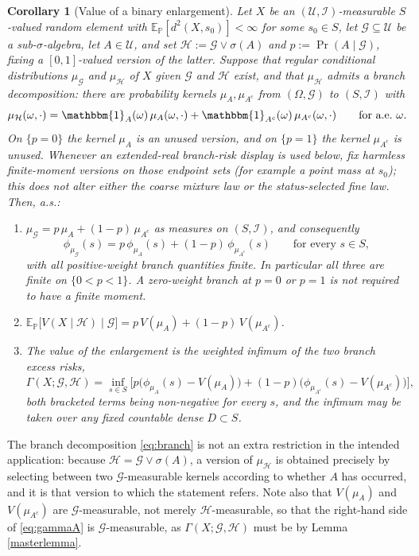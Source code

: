 \documentclass{article}
\newcommand{\E}{\mathbb{E}_{\mathbb{P}}}
\newcommand{\G}{\mathcal{G}}
\newcommand{\I}{\mathcal{I}}
\newcommand{\U}{\mathcal{U}}
\newcommand{\1}{\mathbbm{1}}
\newtheorem{cor}{Corollary}
\begin{document}
\begin{cor}[Value of a binary enlargement]
\label{oraclegap}
Let $X$ be an $(\U,\I)$-measurable $S$-valued random element with
$\E[d^2(X,s_0)]<\infty$ for some $s_0\in S$, let $\G\subseteq\U$ be a
sub-$\sigma$-algebra, let $A\in\U$, and set $\mathcal{H}:=\G\vee\sigma(A)$ and
$p:=\Pr(A\mid\G)$, fixing a $[0,1]$-valued version of the latter. Suppose that
regular conditional distributions $\mu_\G$ and $\mu_\mathcal{H}$ of $X$ given
$\G$ and $\mathcal{H}$ exist, and that $\mu_\mathcal{H}$ admits a branch
decomposition: there are probability kernels $\mu_A,\mu_{A^c}$ from
$(\Omega,\G)$ to $(S,\I)$ with
\begin{equation}\label{eq:branch}
\mu_\mathcal{H}(\omega,\cdot)=\1_A(\omega)\,\mu_A(\omega,\cdot)
+\1_{A^c}(\omega)\,\mu_{A^c}(\omega,\cdot)\qquad\text{for a.e.\ }\omega.
\end{equation}
On $\{p=0\}$ the kernel $\mu_A$ is an unused version, and on $\{p=1\}$ the kernel
$\mu_{A^c}$ is unused. Whenever an extended-real branch-risk display is used below, fix harmless
finite-moment versions on those endpoint sets (for example a point mass at $s_0$); this does not
alter either the coarse mixture law or the status-selected fine law.
Then, a.s.:
\begin{enumerate}
\item[(i)] $\mu_\G=p\,\mu_A+(1-p)\,\mu_{A^c}$ as measures on $(S,\I)$, and
consequently
\[
\phi_{\mu_\G}(s)=p\,\phi_{\mu_A}(s)+(1-p)\,\phi_{\mu_{A^c}}(s)
\qquad\text{for every }s\in S,
\]
with all positive-weight branch quantities finite. In particular all three are finite on
$\{0<p<1\}$. A zero-weight branch at $p=0$ or $p=1$ is not required to have a finite moment.
\item[(ii)] $\E\big[V(X\mid\mathcal{H})\mid\G\big]
=p\,V(\mu_A)+(1-p)\,V(\mu_{A^c})$.
\item[(iii)] The value of the enlargement is the weighted infimum of the two
branch excess risks,
\begin{equation}\label{eq:gammaA}
\Gamma(X;\G,\mathcal{H})
=\inf_{s\in S}\Big[p\big(\phi_{\mu_A}(s)-V(\mu_A)\big)
+(1-p)\big(\phi_{\mu_{A^c}}(s)-V(\mu_{A^c})\big)\Big],
\end{equation}
both bracketed terms being non-negative for every $s$, and the infimum may be
taken over any fixed countable dense $D\subset S$.
\end{enumerate}
\end{cor}
 
The branch decomposition \eqref{eq:branch} is not an extra restriction in the
intended application: because $\mathcal{H}=\G\vee\sigma(A)$, a version of
$\mu_\mathcal{H}$ is obtained precisely by selecting between two
$\G$-measurable kernels according to whether $A$ has occurred, and it is that
version to which the statement refers. Note also that $V(\mu_A)$ and
$V(\mu_{A^c})$ are $\G$-measurable, not merely $\mathcal{H}$-measurable, so
that the right-hand side of \eqref{eq:gammaA} is $\G$-measurable, as
$\Gamma(X;\G,\mathcal{H})$ must be by Lemma \ref{masterlemma}.
 
\end{document}
